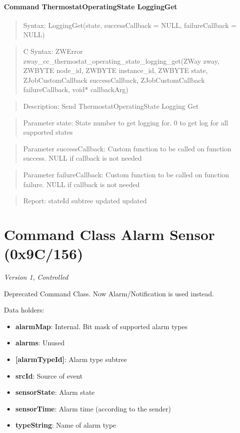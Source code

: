 \paragraph{Command ThermostatOperatingState LoggingGet}
\begin{quote}Syntax: LoggingGet(state, successCallback = NULL, failureCallback = NULL)\end{quote}
\begin{quote}C Syntax: ZWError zway\_cc\_thermostat\_operating\_state\_logging\_get(ZWay zway, ZWBYTE node\_id, ZWBYTE instance\_id, ZWBYTE state, ZJobCustomCallback successCallback, ZJobCustomCallback failureCallback, void* callbackArg)\end{quote}
\begin{quote}Description: Send ThermostatOperatingState Logging Get\end{quote}
\begin{quote}Parameter state: State number to get logging for. 0 to get log for all supported states\end{quote}
\begin{quote}Parameter successCallback: Custom function to be called on function success. NULL if callback is not needed\end{quote}
\begin{quote}Parameter failureCallback: Custom function to be called on function failure. NULL if callback is not needed\end{quote}
\begin{quote}Report: stateId subtree updated updated\end{quote}


\section{Command Class Alarm Sensor (0x9C/156)}

\textit{Version 1, Controlled}
\newline

Deprecated Command Class. Now Alarm/Notification is used instead.
\newline

\noindent
Data holders:

\begin{itemize}
\item \textbf{alarmMap}: Internal. Bit mask of supported alarm types
\item \textbf{alarms}: Unused
\item \textbf{[alarmTypeId]}: Alarm type subtree
\item \qquad\textbf{srcId}: Source of event
\item \qquad\textbf{sensorState}: Alarm state
\item \qquad\textbf{sensorTime}: Alarm time (according to the sender)
\item \qquad\textbf{typeString}: Name of alarm type
\end{itemize}

